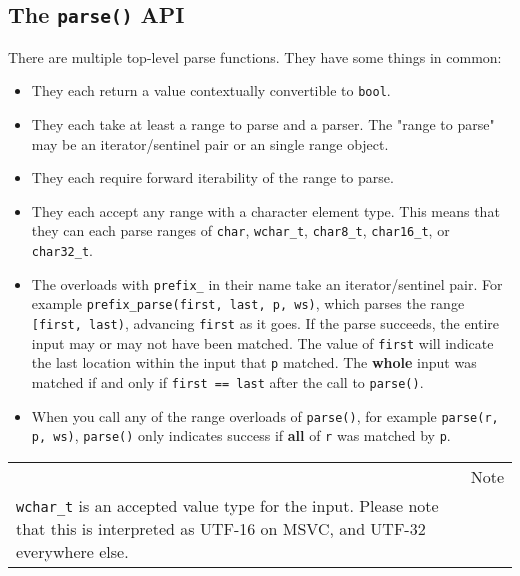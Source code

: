 \subsection{\texorpdfstring{The \texttt{parse()} API}{The parse() API}}

There are multiple top-level parse functions. They have some things in common:

\begin{itemize}
\item
  They each return a value contextually convertible to \texttt{bool}.
\item
  They each take at least a range to parse and a parser. The "range to parse" may be an iterator/sentinel pair or an single range object.
\item
  They each require forward iterability of the range to parse.
\item
  They each accept any range with a character element type. This means that they can each parse ranges of \texttt{char}, \texttt{wchar\_t}, \texttt{char8\_t}, \texttt{char16\_t}, or \texttt{char32\_t}.
\item
  The overloads with \texttt{prefix\_} in their name take an iterator/sentinel pair. For example \texttt{prefix\_parse(first, last, p, ws)}, which parses the range \texttt{{[}first, last)}, advancing \texttt{first} as it goes. If the parse succeeds, the entire input may or may not have been matched. The value of \texttt{first} will indicate the last location within the input that \texttt{p} matched. The \textbf{whole} input was matched if and only if \texttt{first == last} after the call to \texttt{parse()}.
\item
  When you call any of the range overloads of \texttt{parse()}, for example \texttt{parse(r, p, ws)}, \texttt{parse()} only indicates success if \textbf{all} of \texttt{r} was matched by \texttt{p}.
\end{itemize}

\begin{longtable}[]{@{}
  >{\raggedright\arraybackslash}p{}
  >{\raggedright\arraybackslash}p{}@{}}
\toprule\noalign{}
\endhead
\bottomrule\noalign{}
\endlastfoot
\begin{minipage}[t]{\linewidth}\raggedright
\end{minipage} & Note \\
\texttt{wchar\_t} is an accepted value type for the input. Please note that this is interpreted as UTF-16 on MSVC, and UTF-32 everywhere else. & \\
\end{longtable}

